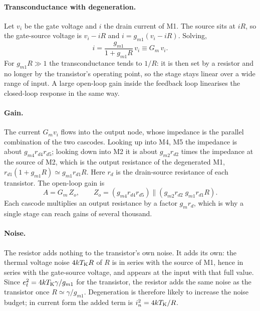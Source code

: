 \documentclass[11pt,a4paper]{article}
\begin{document}
%
\paragraph{Transconductance with degeneration.} Let $v_i$ be the gate voltage
and $i$ the drain current of M1. The source sits at $iR$, so the gate-source
voltage is $v_i-iR$ and $i=g_{m1}(v_i-iR)$. Solving,
%
\begin{equation}
 i = \frac{g_{m1}}{1+g_{m1}R}\,v_i \equiv G_m\,v_i .
\label{eq:Gm}
\end{equation}
%
For $g_{m1}R\gg1$ the transconductance tends to $1/R$: it is then set by a
resistor and no longer by the transistor's operating point, so the stage
stays linear over a wide range of input. A large open-loop gain inside the
feedback loop linearises the closed-loop response in the same way.

%
\paragraph{Gain.} The current $G_mv_i$ flows into the output node, whose
impedance is the parallel combination of the two cascodes. Looking up into
M4, M5 the impedance is about $g_{m4}r_{d4}r_{d5}$; looking down into M2 it is
about $g_{m2}r_{d2}$ times the impedance at the source of M2, which is the
output resistance of the degenerated M1, $r_{d1}(1+g_{m1}R)\simeq
g_{m1}r_{d1}R$. Here $r_d$ is the drain-source resistance of each
transistor. The open-loop gain is
%
\begin{equation}
 A = G_m\,Z_o,
 \qquad
 Z_o = \left(g_{m4}r_{d4}r_{d5}\right)\parallel
       \left(g_{m2}r_{d2}\;g_{m1}r_{d1}R\right).
\end{equation}
%
Each cascode multiplies an output resistance by a factor $g_mr_d$, which is
why a single stage can reach gains of several thousand.

%
\paragraph{Noise.} The resistor adds nothing to the transistor's own noise.
It adds its own: the thermal voltage noise $4kT_{\rm K}R$ of $R$ is in series
with the source of M1, hence in series with the gate-source voltage, and
appears at the input with that full value. Since $e_t^2=4kT_{\rm K}\gamma/g_{m1}$
for the transistor, the resistor adds the same noise as the transistor once
$R\simeq\gamma/g_{m1}$. Degeneration is therefore likely to increase the
noise budget; in current form the added term is $i_n^2=4kT_{\rm K}/R$.
\end{document}
